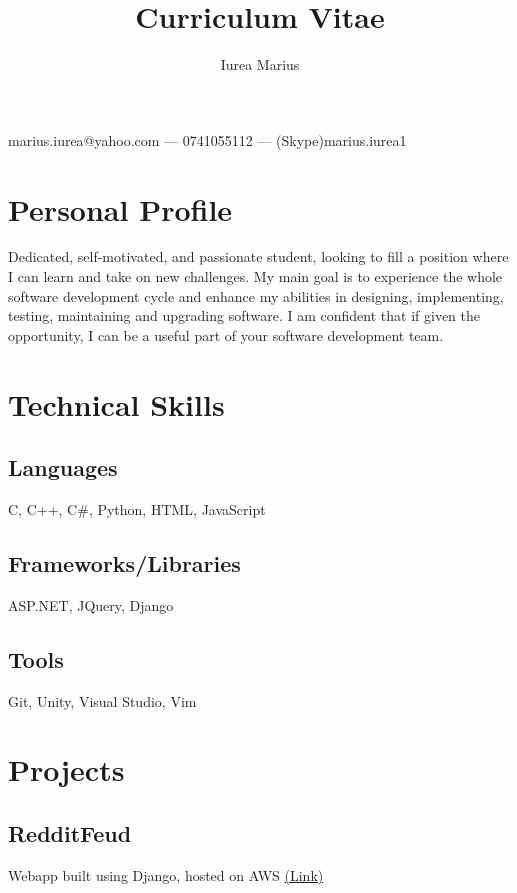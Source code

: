 \documentclass[a4paper,hidelinks,12pt]{article}
\begin{document}
\title{Curriculum Vitae}
\author{Iurea Marius}
\renewcommand{\maketitle}
{
        \begin{center}
        {\huge\bfseries
        \thetitle

        \theauthor}

        marius.iurea@yahoo.com --- 0741055112 --- (Skype)marius.iurea1

        \end{center}
}

\maketitle

\section{Personal Profile}
Dedicated, self-motivated, and passionate student, looking to fill a position where I can learn and take on new
challenges. My main goal is to experience the whole software development cycle and enhance my abilities in 
designing, implementing, testing, maintaining and upgrading software. I am confident that if given the 
opportunity, I can be a useful part of your software development team.


\section{Technical Skills}
\subsection{Languages}
C, C++, C\#, Python, HTML, JavaScript
\subsection{Frameworks/Libraries}
ASP.NET, JQuery, Django
\subsection{Tools}
Git, Unity, Visual Studio, Vim
\section{Projects}
\subsection{RedditFeud}
Webapp built using Django, hosted on AWS \href{https:\\www.redditfeud.com}{(Link)}
\end{document}
